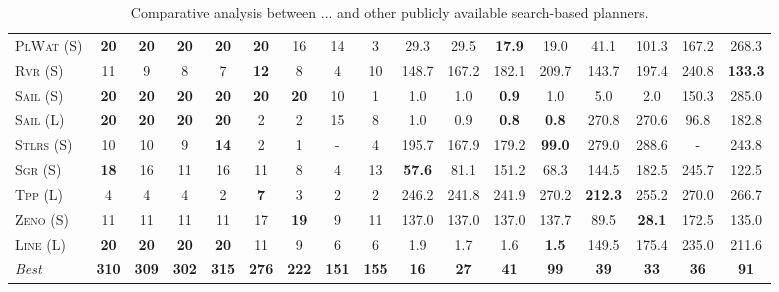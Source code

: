 \begin{table}[tb]
{\begin{tabular}{|l||cccccccc||cccccccc||}
\textsc{PlWat} (S)&\textbf{20}&\textbf{20}&\textbf{20}&\textbf{20}&\textbf{20}&16&14&3&29.3&29.5&\textbf{17.9}&19.0&41.1&101.3&167.2&268.3\\
\textsc{Rvr} (S)&11&9&8&7&\textbf{12}&8&4&10&148.7&167.2&182.1&209.7&143.7&197.4&240.8&\textbf{133.3}\\
\textsc{Sail} (S)&\textbf{20}&\textbf{20}&\textbf{20}&\textbf{20}&\textbf{20}&\textbf{20}&10&1&1.0&1.0&\textbf{0.9}&1.0&5.0&2.0&150.3&285.0\\
\textsc{Sail} (L)&\textbf{20}&\textbf{20}&\textbf{20}&\textbf{20}&2&2&15&8&1.0&0.9&\textbf{0.8}&\textbf{0.8}&270.8&270.6&96.8&182.8\\
\textsc{Stlrs} (S)&10&10&9&\textbf{14}&2&1&-&4&195.7&167.9&179.2&\textbf{99.0}&279.0&288.6&-&243.8\\
\textsc{Sgr} (S)&\textbf{18}&16&11&16&11&8&4&13&\textbf{57.6}&81.1&151.2&68.3&144.5&182.5&245.7&122.5\\
\textsc{Tpp} (L)&4&4&4&2&\textbf{7}&3&2&2&246.2&241.8&241.9&270.2&\textbf{212.3}&255.2&270.0&266.7\\
\textsc{Zeno} (S)&11&11&11&11&17&\textbf{19}&9&11&137.0&137.0&137.0&137.7&89.5&\textbf{28.1}&172.5&135.0\\
\textsc{Line} (L)&\textbf{20}&\textbf{20}&\textbf{20}&\textbf{20}&11&9&6&6&1.9&1.7&1.6&\textbf{1.5}&149.5&175.4&235.0&211.6
\\\hline
\textit{Best}&\textbf{310}&\textbf{309}&\textbf{302}&\textbf{315}&\textbf{276}&\textbf{222}&\textbf{151}&\textbf{155}&\textbf{16}&\textbf{27}&\textbf{41}&\textbf{99}&\textbf{39}&\textbf{33}&\textbf{36}&\textbf{91}\\\hline

        \end{tabular}}
        \caption{Comparative analysis between ... and other publicly available search-based planners.}
        \label{tab:search}
        \end{table}
        